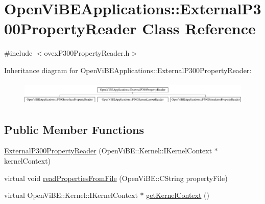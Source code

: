 \hypertarget{classOpenViBEApplications_1_1ExternalP300PropertyReader}{
\section{OpenViBEApplications::ExternalP300PropertyReader Class Reference}
\label{classOpenViBEApplications_1_1ExternalP300PropertyReader}
}


{\ttfamily \#include $<$ovexP300PropertyReader.h$>$}

Inheritance diagram for OpenViBEApplications::ExternalP300PropertyReader:\begin{figure}[H]
\begin{center}
\leavevmode
\includegraphics[height=1.138211cm]{classOpenViBEApplications_1_1ExternalP300PropertyReader}
\end{center}
\end{figure}
\subsection*{Public Member Functions}
\begin{DoxyCompactItemize}
\item 
\hyperlink{classOpenViBEApplications_1_1ExternalP300PropertyReader_a310646db1656369da0d1f214f0c7d3b4}{ExternalP300PropertyReader} (OpenViBE::Kernel::IKernelContext $\ast$kernelContext)
\item 
virtual void \hyperlink{classOpenViBEApplications_1_1ExternalP300PropertyReader_a8a191585eae83876f09c53c1f7b42cc3}{readPropertiesFromFile} (OpenViBE::CString propertyFile)
\item 
virtual OpenViBE::Kernel::IKernelContext $\ast$ \hyperlink{classOpenViBEApplications_1_1ExternalP300PropertyReader_a04eff583d40452b888b0fb685771e56c}{getKernelContext} ()
\end{DoxyCompactItemize}
